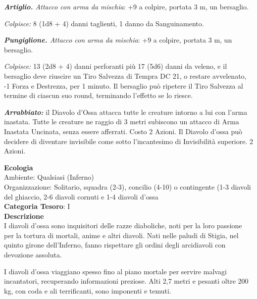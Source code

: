 \begin{multicols}{2}
{\emph{\textbf{Artiglio.} Attacco con arma da mischia}: +9 a colpire, portata 3 m, un bersaglio.

\emph{Colpisce:} 8 (1d8 + 4) danni taglienti, 1 danno da Sanguinamento.

\emph{\textbf{Pungiglione.} Attacco con arma da mischia}: +9 a colpire, portata 3 m, un bersaglio.

\emph{Colpisce:} 13 (2d8 + 4) danni perforanti più 17 (5d6) danni da veleno, e il bersaglio deve riuscire un Tiro Salvezza di Tempra DC 21, o restare avvelenato, -1 Forza e Destrezza, per 1 minuto. Il bersaglio può ripetere il Tiro Salvezza al termine di ciascun suo round, terminando l'effetto se lo riesce.

\emph{\textbf{Arrabbiato:}} il Diavolo d'Ossa attacca tutte le creature intorno a lui con l'arma inastata. Tutte le creature ne raggio di 3 metri subiscono un attacco di Arma Inastata Uncinata, senza essere afferrati. Costo 2 Azioni. Il Diavolo d'ossa può decidere di diventare invisibile come sotto l'incantesimo di Invisibilità superiore. 2 Azioni.

\textbf{Ecologia}\\
Ambiente: Qualsiasi (Inferno)\\
Organizzazione: Solitario, squadra (2-3), concilio (4-10) o contingente (1-3 diavoli del ghiaccio, 2-6 diavoli cornuti e 1-4 diavoli d'ossa\\
\textbf{Categoria Tesoro}: I\\
\textbf{Descrizione}\\
I diavoli d'ossa sono inquisitori delle razze diaboliche, noti per la loro passione per la tortura di mortali, anime e altri diavoli. Nati nelle paludi di Stigia, nel quinto girone dell'Inferno, fanno rispettare gli ordini degli arcidiavoli con devozione assoluta.

I diavoli d'ossa viaggiano spesso fino al piano mortale per servire malvagi incantatori, recuperando informazioni preziose. Alti 2,7 metri e pesanti oltre 200 kg, con coda e ali terrificanti, sono imponenti e temuti.

}
\end{multicols}
